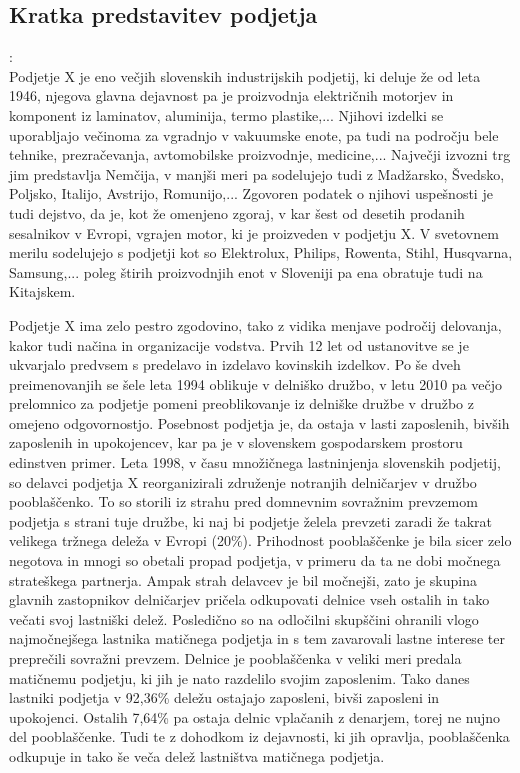 \documentclass[12pt,a4paper]{amsart}
\theoremstyle{definition} %
\theoremstyle{plain} %
\begin{document}
\subsection{Kratka predstavitev podjetja}:\\

Podjetje X je eno večjih slovenskih industrijskih podjetij, ki deluje že od leta 1946, njegova glavna dejavnost pa je proizvodnja električnih motorjev in komponent iz laminatov, aluminija, termo plastike,... Njihovi izdelki se uporabljajo večinoma za vgradnjo v vakuumske enote, pa tudi na področju bele tehnike, prezračevanja, avtomobilske proizvodnje, medicine,...
Največji izvozni trg jim predstavlja Nemčija, v manjši meri pa sodelujejo tudi z Madžarsko, Švedsko, Poljsko, Italijo, Avstrijo, Romunijo,... Zgovoren podatek o njihovi uspešnosti je tudi dejstvo, da je, kot že omenjeno zgoraj, v kar šest od desetih prodanih sesalnikov v Evropi, vgrajen motor, ki je proizveden v podjetju X. V svetovnem merilu sodelujejo s podjetji kot so Elektrolux, Philips, Rowenta, Stihl, Husqvarna, Samsung,... poleg štirih proizvodnjih enot v Sloveniji pa ena obratuje tudi na Kitajskem.\par
Podjetje X ima zelo pestro zgodovino, tako z vidika menjave področij delovanja, kakor tudi načina in organizacije vodstva. Prvih 12 let od ustanovitve se je ukvarjalo predvsem s predelavo in izdelavo kovinskih izdelkov. Po še dveh preimenovanjih se šele leta 1994 oblikuje v delniško družbo, v letu 2010 pa večjo prelomnico za podjetje pomeni preoblikovanje iz delniške družbe v družbo z omejeno odgovornostjo. Posebnost podjetja je, da ostaja v lasti zaposlenih, bivših zaposlenih in upokojencev, kar pa je v slovenskem gospodarskem prostoru edinstven primer. Leta 1998, v času množičnega lastninjenja slovenskih podjetij, so delavci podjetja X reorganizirali združenje notranjih delničarjev v družbo pooblaščenko. To so storili iz strahu pred domnevnim sovražnim prevzemom podjetja s strani tuje družbe, ki naj bi podjetje želela prevzeti zaradi že takrat velikega tržnega deleža v Evropi (20\%). Prihodnost pooblaščenke je bila sicer zelo negotova in mnogi so obetali propad podjetja, v primeru da ta ne dobi močnega strateškega partnerja. Ampak strah delavcev je bil močnejši, zato je skupina glavnih zastopnikov delničarjev pričela odkupovati delnice vseh ostalih in tako večati svoj lastniški delež. Posledično so na odločilni skupščini ohranili vlogo najmočnejšega lastnika matičnega podjetja in s tem zavarovali lastne interese ter preprečili sovražni prevzem. Delnice je pooblaščenka v veliki meri predala matičnemu podjetju, ki jih je nato razdelilo svojim zaposlenim. Tako danes lastniki podjetja v 92,36\% deležu ostajajo zaposleni, bivši zaposleni in upokojenci. Ostalih 7,64\% pa ostaja delnic vplačanih z denarjem, torej ne nujno del pooblaščenke. Tudi te z dohodkom iz dejavnosti, ki jih opravlja, pooblaščenka odkupuje in tako še veča delež lastništva matičnega podjetja. \\
\end{document}
